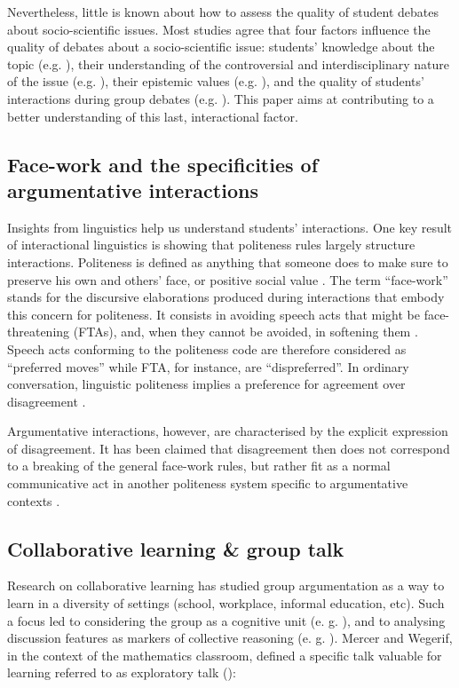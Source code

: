 \documentclass[output=paper]{langscibook}
\begin{document}
Nevertheless, little is known about how to assess the quality of student debates about socio-scientific issues. Most studies agree that four factors influence the quality of debates about a socio-scientific issue: students’ knowledge about the topic (e.g. \citealt{LewisLeach2006}), their understanding of the controversial and interdisciplinary nature of the issue (e.g. \citealt{DriverEtAl1996}), their epistemic values (e.g. \citealt{DésautelsLarochelle1998,Sandoval2005}), and the quality of students’ interactions during group debates (e.g. \citealt{Albe2006,Mercer1996}). This paper aims at contributing to a better understanding of this last, interactional factor.

\subsection{Face-work and the specificities of argumentative interactions}

Insights from linguistics help us understand students’ interactions. One key result of interactional linguistics is showing that politeness rules largely structure interactions. Politeness is defined as anything that someone does to make sure to preserve his own and others’ face, or positive social value \citep{Goffman1967}. The term “face-work” stands for the discursive elaborations produced during interactions that embody this concern for politeness. It consists in avoiding speech acts that might be face-threatening (FTAs), and, when they cannot be avoided, in softening them \citep{BrownLevinson1988}. Speech acts conforming to the politeness code are therefore considered as “preferred moves” while FTA, for instance, are “dispreferred”. In ordinary conversation, linguistic politeness implies a preference for agreement over disagreement \citep{Pomerantz1984}.

Argumentative interactions, however, are characterised by the explicit expression of disagreement. It has been claimed that disagreement then does not correspond to a breaking of the general face-work rules, but rather fit as a normal communicative act in another politeness system specific to argumentative contexts \citep{Plantin2018}.

\subsection{Collaborative learning \& group talk}

Research on collaborative learning has studied group argumentation as a way to learn in a diversity of settings (school, workplace, informal education, etc). Such a focus led to considering the group as a cognitive unit (e. g. \citealt{Stahl2006}), and to analysing discussion features as markers of collective reasoning (e. g. \citealt{OsborneEtAl2004}). Mercer and Wegerif, in the context of the mathematics classroom, defined a specific talk valuable for learning referred to as exploratory talk (\citealt{Mercer1996,WegerifMercer1997}):
\end{document}
